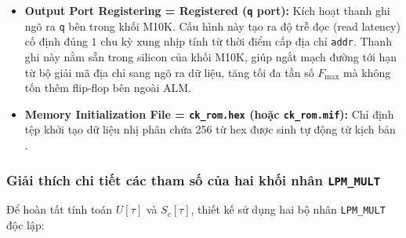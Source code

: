 \begin{itemize}[leftmargin=1.5em, itemsep=3pt]
    \item \textbf{Output Port Registering = Registered (\texttt{q} port):}
    Kích hoạt thanh ghi ngõ ra \texttt{q} bên trong khối M10K. Cấu hình này tạo ra độ trễ đọc (read latency) cố định đúng $1\text{ chu kỳ xung nhịp}$ tính từ thời điểm cấp địa chỉ \texttt{addr}. Thanh ghi này nằm sẵn trong silicon của khối M10K, giúp ngắt mạch đường tới hạn từ bộ giải mã địa chỉ sang ngõ ra dữ liệu, tăng tối đa tần số $F_{\max}$ mà không tốn thêm flip-flop bên ngoài ALM.

    \item \textbf{Memory Initialization File = \texttt{ck\_rom.hex} (hoặc \texttt{ck\_rom.mif}):}
    Chỉ định tệp khởi tạo dữ liệu nhị phân chứa 256 từ hex được sinh tự động từ kịch bản .
\end{itemize}

\subsubsection*{Giải thích chi tiết các tham số của hai khối nhân \texttt{LPM\_MULT}}
Để hoàn tất tính toán $U[\tau]$ và $S_c[\tau]$, thiết kế sử dụng hai bộ nhân \texttt{LPM\_MULT} độc lập:

